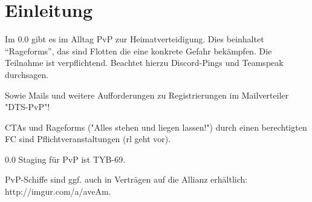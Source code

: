 \section{Einleitung}
Im 0.0 gibt es im Alltag PvP zur Heimatverteidigung. Dies beinhaltet “Rageforms”, das sind Flotten die eine konkrete Gefahr bekämpfen. Die Teilnahme ist verpflichtend. Beachtet hierzu Discord-Pings und Teamspeak durchsagen.

Sowie Mails und weitere Aufforderungen zu Registrierungen im Mailverteiler "DTS-PvP"!

CTAs und Rageforms ("Alles stehen und liegen lassen!") durch einen berechtigten FC sind Pflichtveranstaltungen (rl geht vor).

0.0 Staging für PvP ist TYB-69.

PvP-Schiffe sind ggf. auch in Verträgen auf die Allianz erhältlich: http://imgur.com/a/aveAm.

